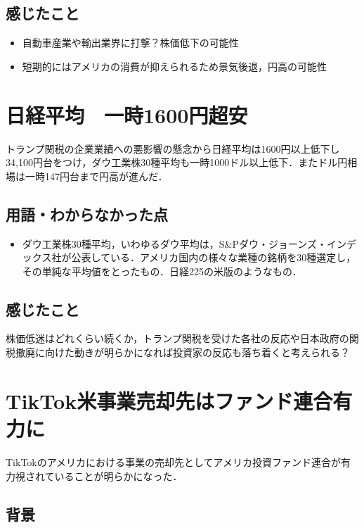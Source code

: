 \documentclass{ltjsarticle}
\begin{document}
\subsection{感じたこと}

\begin{itemize}
  \item 自動車産業や輸出業界に打撃？株価低下の可能性
  \item 短期的にはアメリカの消費が抑えられるため景気後退，円高の可能性
\end{itemize}



\section{日経平均　一時1600円超安}

トランプ関税の企業業績への悪影響の懸念から日経平均は1600円以上低下し34,100円台をつけ，ダウ工業株30種平均も一時1000ドル以上低下．またドル円相場は一時147円台まで円高が進んだ．


\subsection{用語・わからなかった点}

\begin{itemize}
  \item ダウ工業株30種平均，いわゆるダウ平均は，S\&Pダウ・ジョーンズ・インデックス社が公表している．アメリカ国内の様々な業種の銘柄を30種選定し，その単純な平均値をとったもの．日経225の米版のようなもの．
\end{itemize}

\subsection{感じたこと}

株価低迷はどれくらい続くか，トランプ関税を受けた各社の反応や日本政府の関税撤廃に向けた動きが明らかになれば投資家の反応も落ち着くと考えられる？


\section{TikTok米事業売却先はファンド連合有力に}

TikTokのアメリカにおける事業の売却先としてアメリカ投資ファンド連合が有力視されていることが明らかになった．

\subsection{背景}
\end{document}
